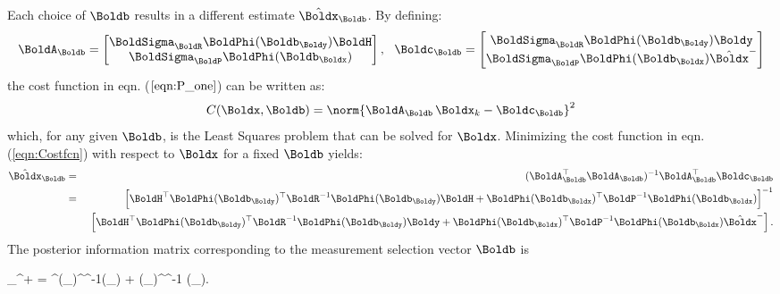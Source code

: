 Each choice of $\Boldb$ results in a different estimate $\hat{\Boldx}_\Boldb$. 
By defining:
\begin{equation} \label{eqn:measurement_Ab_cb}
\BoldA_{\Boldb} = \begin{bmatrix} 
	\BoldSigma_{\BoldR} \BoldPhi(\Boldb_{\Boldy})\BoldH \\ 
	\BoldSigma_{\BoldP} \BoldPhi(\Boldb_{\Boldx})	
	\end{bmatrix}, \ \
\Boldc_{\Boldb} = \begin{bmatrix} 
	\BoldSigma_{\BoldR} \BoldPhi(\Boldb_{\Boldy}) \Boldy \\ 
	\BoldSigma_{\BoldP} \BoldPhi(\Boldb_{\Boldx}) \hat{\Boldx}^- 	\end{bmatrix} 
\end{equation}
the cost function in eqn. ($\ref{eqn:P_one}$) can be written as:
\begin{equation} \label{eqn:Costfcn}
	C(\Boldx,\Boldb) = \norm{\BoldA_{\Boldb} \, \Boldx_k - \Boldc_{\Boldb}}^2
\end{equation}
which, for any given $\Boldb$, is the Least Squares problem that can be solved for $\Boldx$.
Minimizing the cost function in eqn. (\ref{eqn:Costfcn}) with respect to $\Boldx$ for a fixed $\Boldb$ yields:
\begin{eqnarray} \label{eqn:KF_info_msr_selected}
\hat{\Boldx}_\Boldb &=& 
	(\BoldA_\Boldb^{\top}\BoldA_\Boldb)^{-1} 	
			\BoldA_\Boldb^{\top}\Boldc_{\Boldb}  \label{eqn:Xleastsquares}\\ 
	&=& \left[ \BoldH^\top \BoldPhi(\Boldb_{\Boldy})^\top \BoldR^{-1} \BoldPhi(\Boldb_{\Boldy})\BoldH 
		+ \BoldPhi(\Boldb_{\Boldx})^\top\BoldP^{-1} \BoldPhi(\Boldb_{\Boldx}) \right]^{-1}  \nonumber  
	\\ &  & ~
	\left[ \BoldH^\top \BoldPhi(\Boldb_{\Boldy})^\top \BoldR^{-1} \BoldPhi(\Boldb_{\Boldy})\Boldy +  \BoldPhi(\Boldb_{\Boldx})^\top\BoldP^{-1} \BoldPhi(\Boldb_{\Boldx})\hat{\Boldx}^- \right].\nonumber
\end{eqnarray}
The posterior information matrix corresponding to the measurement selection vector $\Boldb$ is
\begin{flalign} \label{eqn:PosteriorInfoMatrix}
\BoldJ_{\Boldb}^+ = \BoldH^\top \BoldPhi(\Boldb_{\Boldy})^\top \BoldR^{-1}\BoldPhi(\Boldb_{\Boldy})\BoldH
		 +  \BoldPhi(\Boldb_{\Boldx})^\top\BoldP^{-1} \BoldPhi(\Boldb_{\Boldx}).
\end{flalign}


